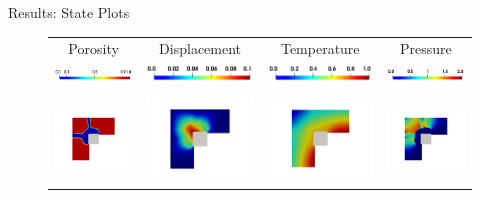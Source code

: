 \documentclass[10pt,xcolor=dvipsnames,compress]{beamer}
\begin{document}
\begin{frame}{Results: State Plots}
\begin{figure}
    \centering
    \begin{tabular}{c c c c}
         Porosity & Displacement & Temperature & Pressure \\
         \includegraphics[width=0.18\linewidth]{Figures/porosity_contour.png}&
         \includegraphics[width=0.18\linewidth]{Figures/Disp_contour.png}&
         \includegraphics[width=0.18\linewidth]{Figures/temp_contour.png}&
         \includegraphics[width=0.18\linewidth]{Figures/pressure_contour.png}\\
         \hline \vspace{-0.1in}\\
         \includegraphics[trim={3.6in 1.8in 3.5in 2.5in},clip,width=0.18\linewidth]{Figures/porosity.png}&  
         \includegraphics[trim={3.6in 1.8in 3.5in 2.5in},clip,width=0.18\linewidth]{Figures/Disp.png}&
         \includegraphics[trim={3.6in 1.8in 3.5in 2.5in},clip,width=0.18\linewidth]{Figures/Tf.png}&
         \includegraphics[trim={3.6in 1.8in 3.5in 2.5in},clip,width=0.18\linewidth]{Figures/pressure.png}\\

\end{tabular}
\end{figure}
\end{frame}
\end{document}

